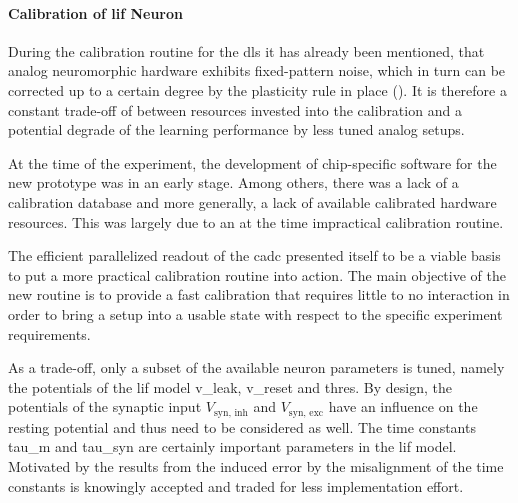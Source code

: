 \paragraph{Calibration of \acrshort{lif} Neuron}
During the calibration routine for the \gls{dls} it has already been mentioned, that analog neuromorphic hardware exhibits fixed-pattern noise, which in turn can be corrected up to a certain degree by the plasticity rule in place (\citealp{wunderlich2019advantages}). It is therefore a constant trade-off of between resources invested into the calibration and a potential degrade of the learning performance by less tuned analog setups.

At the time of the experiment, the development of chip-specific software for the new prototype was in an early stage. Among others, there was a lack of a calibration database and more generally, a lack of available calibrated hardware resources. This was largely due to an at the time impractical calibration routine.

The efficient parallelized readout of the \gls{cadc} presented itself to be a viable basis to put a more practical calibration routine into action. The main objective of the new routine is to provide a fast calibration that requires little to no interaction in order to bring a setup into a usable state with respect to the specific experiment requirements. 

As a trade-off, only a subset of the available neuron parameters is tuned, namely the potentials of the \gls{lif} model \gls{v_leak}, \gls{v_reset} and \gls{thres}. By design, the potentials of the synaptic input $V_\text{syn, inh}$ and $V_\text{syn, exc}$ have an influence on the resting potential and thus need to be considered as well. The time constants \gls{tau_m} and \gls{tau_syn} are certainly important parameters in the \gls{lif} model. Motivated by the results from \cite{wunderlich2019advantages} the induced error by the misalignment of the time constants is knowingly accepted and traded for less implementation effort.

